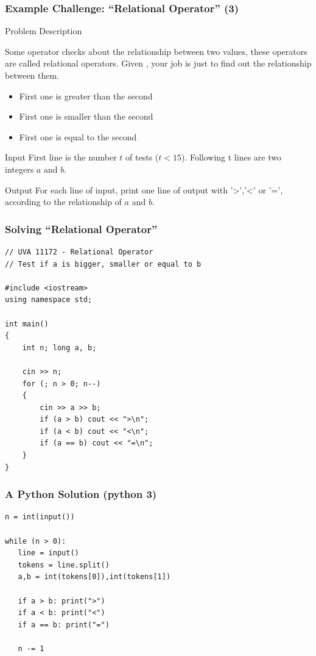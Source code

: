 \documentclass{beamer}
\begin{document}
\begin{frame}
  \frametitle{Example Challenge: ``Relational Operator'' (3)}
  
  \begin{block}{Problem Description}
    {\smaller Some operator checks about the relationship between two
      values, these operators are called relational operators. Given
      , your job is just to find out
      the relationship between them.
      \begin{itemize}
      \item First one is greater than the second
      \item First one is smaller than the second
      \item First one is equal to the second
      \end{itemize}
    }
  \end{block}
  \begin{block}{Input}
    {\smaller
      First line is the number $t$ of tests ($t < 15$). Following t lines 
      are two integers $a$ and $b$.
    }
  \end{block}
  \begin{block}{Output}
    {\smaller
      For each line of input, print one line of output with '>','<' or '=', 
      according to the relationship of $a$ and $b$.
    }
  \end{block}
\end{frame}



\begin{frame}[fragile]
  \frametitle{Solving ``Relational Operator''}
    
\begin{block}{}
{\smaller
\begin{verbatim}
// UVA 11172 - Relational Operator
// Test if a is bigger, smaller or equal to b

#include <iostream>
using namespace std;

int main()
{
    int n; long a, b;

    cin >> n;    
    for (; n > 0; n--)
    {
        cin >> a >> b;
        if (a > b) cout << ">\n";
        if (a < b) cout << "<\n";
        if (a == b) cout << "=\n";
    }
}
\end{verbatim}}
\end{block}
\end{frame}

\begin{frame}[fragile]
  \frametitle{A Python Solution (python 3)}
  \begin{block}{}
\begin{verbatim}
n = int(input())

while (n > 0):
   line = input()
   tokens = line.split()
   a,b = int(tokens[0]),int(tokens[1])

   if a > b: print(">")
   if a < b: print("<")
   if a == b: print("=")

   n -= 1
\end{verbatim}
  \end{block}
  
\end{frame}
\end{document}
